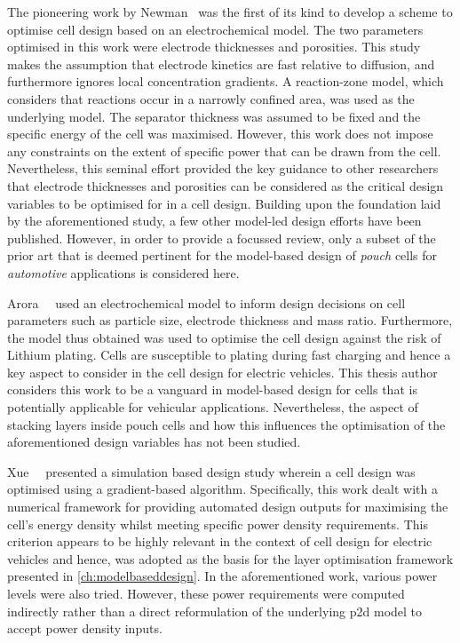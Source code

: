 The pioneering  work by Newman~\cite{Newman1995}  was the  first of its  kind to
develop a  scheme to  optimise cell  design based  on an  electrochemical model.
The  two  parameters optimised  in  this  work  were electrode  thicknesses  and
porosities. This  study makes  the assumption that  electrode kinetics  are fast
relative to diffusion, and furthermore  ignores local concentration gradients. A
reaction-zone model, which considers that reactions occur in a narrowly confined
area, was used  as the underlying model. The separator  thickness was assumed to
be fixed and the  specific energy of the cell was  maximised. However, this work
does not  impose any  constraints on the  extent of specific  power that  can be
drawn from the cell. Nevertheless, this seminal effort provided the key guidance
to other researchers that electrode thicknesses and porosities can be considered
as the critical design variables to be  optimised for in a cell design. Building
upon the  foundation laid  by the  aforementioned study,  a few  other model-led
design efforts  have been  published. However,  in order  to provide  a focussed
review,  only a  subset  of the  prior  art  that is  deemed  pertinent for  the
model-based design  of \emph{pouch} cells for  \emph{automotive} applications is
considered here.

Arora~\etal~\cite{Arora1999}  used an  electrochemical  model  to inform  design
decisions on cell parameters such as particle size, electrode thickness and mass
ratio. Furthermore, the model thus obtained was used to optimise the cell design
against the  risk of Lithium  plating. Cells  are susceptible to  plating during
fast charging and hence a key aspect to consider in the cell design for electric
vehicles. This thesis author considers this work to be a vanguard in model-based
design  for cells  that is  potentially applicable  for vehicular  applications.
Nevertheless, the  aspect of  stacking layers  inside pouch  cells and  how this
influences the optimisation of the  aforementioned design variables has not been
studied.

Xue~\etal~\cite{Xue2013}  presented a  simulation based  design study  wherein a
cell design was  optimised using a gradient-based  algorithm. Specifically, this
work dealt with a numerical framework for providing automated design outputs for
maximising  the cell's  energy  density whilst  meeting  specific power  density
requirements. This  criterion appears to  be highly  relevant in the  context of
cell design for  electric vehicles and hence,  was adopted as the  basis for the
layer  optimisation framework  presented in  \cref{ch:modelbaseddesign}. In  the
aforementioned work, various power levels  were also tried. However, these power
requirements were computed indirectly rather  than a direct reformulation of the
underlying \gls{p2d} model to accept power density inputs.

